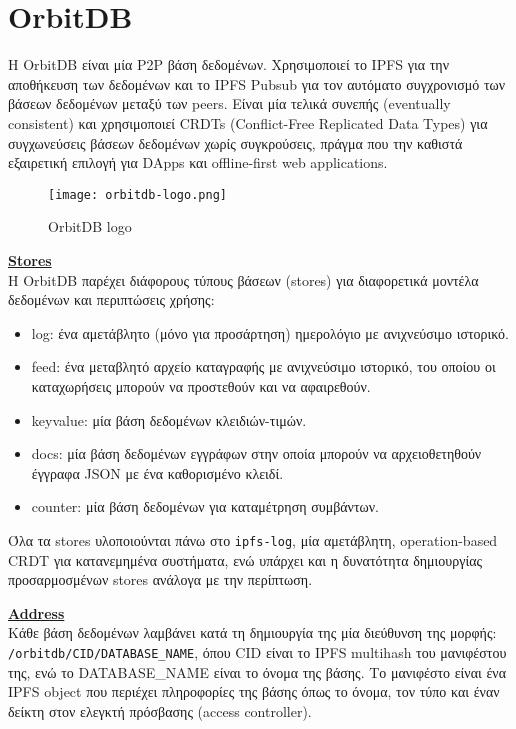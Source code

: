 \section{OrbitDB}

Η OrbitDB είναι μία P2P βάση δεδομένων. Χρησιμοποιεί το IPFS για την αποθήκευση των δεδομένων και το IPFS Pubsub για τον αυτόματο συγχρονισμό των βάσεων δεδομένων μεταξύ των peers. Είναι μία τελικά συνεπής (eventually consistent) και χρησιμοποιεί CRDTs (Conflict-Free Replicated Data Types) για συγχωνεύσεις βάσεων δεδομένων χωρίς συγκρούσεις, πράγμα που την καθιστά εξαιρετική επιλογή για DApps και offline-first web applications.\cite{orbitdb}

\begin{figure}[H]
	\centering
	\texttt{[image: orbitdb-logo.png]}
	\caption{OrbitDB logo}
\end{figure}

\underline{\textbf{Stores}}\\
Η OrbitDB παρέχει διάφορους τύπους βάσεων (stores) για διαφορετικά μοντέλα δεδομένων και περιπτώσεις χρήσης:

\begin{itemize}
	\item log: ένα αμετάβλητο (μόνο για προσάρτηση) ημερολόγιο με ανιχνεύσιμο ιστορικό.
	\item feed: ένα μεταβλητό αρχείο καταγραφής με ανιχνεύσιμο ιστορικό, του οποίου οι καταχωρήσεις μπορούν να προστεθούν και να αφαιρεθούν.
	\item keyvalue: μία βάση δεδομένων κλειδιών-τιμών.
	\item docs: μία βάση δεδομένων εγγράφων στην οποία μπορούν να αρχειοθετηθούν έγγραφα JSON με ένα καθορισμένο κλειδί.
	\item counter: μία βάση δεδομένων για καταμέτρηση συμβάντων.
\end{itemize}

Όλα τα stores υλοποιούνται πάνω στο \texttt{ipfs-log}, μία αμετάβλητη, operation-based CRDT για κατανεμημένα συστήματα, ενώ υπάρχει και η δυνατότητα δημιουργίας προσαρμοσμένων stores ανάλογα με την περίπτωση.

\underline{\textbf{Address}}\\
Κάθε βάση δεδομένων λαμβάνει κατά τη δημιουργία της μία διεύθυνση της μορφής: \texttt{/orbitdb/CID/DATABASE\_NAME}, όπου CID είναι το IPFS multihash του μανιφέστου της, ενώ το DATABASE\_NAME είναι το όνομα της βάσης\cite{orbitdb-guide}. Το μανιφέστο είναι ένα IPFS object που περιέχει πληροφορίες της βάσης όπως το όνομα, τον τύπο και έναν δείκτη στον ελεγκτή πρόσβασης (access controller).

